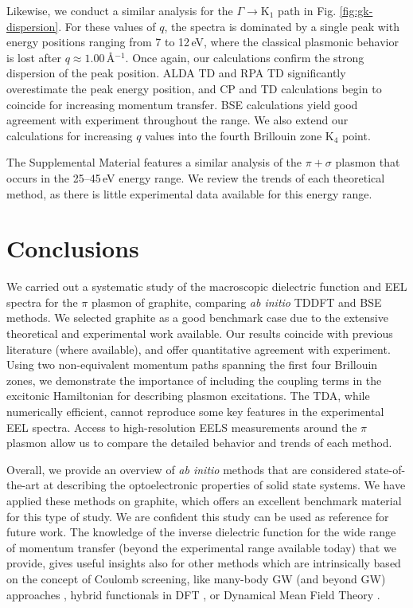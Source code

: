 \documentclass[aps,prb,10pt,showpacs,superscriptaddress,twocolumn,notitlepage]{revtex4-1}
\begin{document}
Likewise, we conduct a similar analysis for the $\Gamma \rightarrow
\mathrm{K}_{1}$ path in Fig. \ref{fig:gk-dispersion}. For these values of
$q$, the spectra is dominated by a single peak with energy positions ranging
from 7 to 12\,eV, where the classical plasmonic behavior is lost after $q\approx
1.00$\,\r{A}$^{-1}$. Once again, our calculations confirm the strong dispersion
of the peak position. ALDA TD and RPA TD significantly overestimate the peak
energy position, and CP and TD calculations begin to coincide for increasing
momentum transfer. BSE calculations yield good agreement with experiment
throughout the range. We also extend our calculations for increasing $q$ values
into the fourth Brillouin zone K$_{4}$ point.

The Supplemental Material features a similar analysis of the $\pi + \sigma$
plasmon that occurs in the 25--45\,eV energy range. We review the trends of each
theoretical method, as there is little experimental data available for this
energy range.


\section{Conclusions}\label{sec:conclusions}

We carried out a systematic study of the macroscopic dielectric function and EEL
spectra for the $\pi$ plasmon of graphite, comparing \emph{ab initio} TDDFT and
BSE methods. We selected graphite as a good benchmark case due to the extensive
theoretical and experimental work available. Our results coincide with previous
literature (where available), and offer quantitative agreement with experiment.
Using two non-equivalent momentum paths spanning the first four Brillouin zones,
we demonstrate the importance of including the coupling terms in the excitonic
Hamiltonian for describing plasmon excitations. The TDA, while numerically
efficient, cannot reproduce some key features in the experimental EEL spectra.
Access to high-resolution EELS measurements around the $\pi$ plasmon allow us to
compare the detailed behavior and trends of each method.

Overall, we provide an overview of \emph{ab initio} methods that are considered
state-of-the-art at describing the optoelectronic properties of solid state
systems. We have applied these methods on graphite, which offers an excellent
benchmark material for this type of study. We are confident this study can be
used as reference for future work. The knowledge of the inverse dielectric
function for the wide range of momentum transfer (beyond the
experimental range available today) that we provide, gives useful insights also
for other methods which are intrinsically based on the concept of Coulomb
screening, like many-body GW (and beyond GW) approaches \cite{rodlPRB17,
luciabook}, hybrid functionals in DFT \cite{krukauJCP06}, or Dynamical Mean
Field Theory \cite{biermannJPCM14}.
\end{document}
